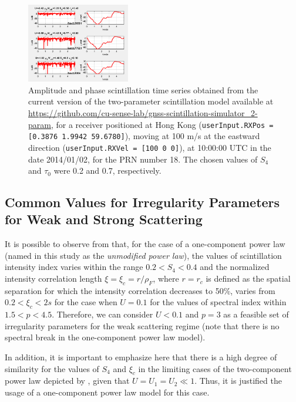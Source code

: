\begin{figure}
    \centering
    \includegraphics[width=0.40\textwidth]{figures/Low_intensity_test.png}
    \caption{Amplitude and phase scintillation time series obtained from the current version of the two-parameter scintillation model available at \url{https://github.com/cu-sense-lab/gnss-scintillation-simulator_2-param}, for a receiver positioned at Hong Kong (\texttt{userInput.RXPos = [0.3876 1.9942 59.6780]}), moving at 100 m/s at the eastward direction (\texttt{userInput.RXVel = [100 0 0]}), at 10:00:00 UTC in the date 2014/01/02, for the PRN number 18. The chosen values of $S_4$ and $\tau_0$ were 0.2 and 0.7, respectively.}
    \label{fig:low_scintillation_test}
\end{figure}

\subsection{Common Values for Irregularity Parameters for Weak and Strong Scattering}
\label{subsec:common_values_irr_param}
It is possible to observe from \cite[Section 4.4, Figures 7a, 7b, 8a, 8b]{Carrano2016OverviewOfTwoComponentPowerLaw} that, for the case of a one-component power law (named in this study as the \textit{unmodified power law}), the values of scintillation intensity index varies within the range $0.2 < S_4 < 0.4$ and the normalized intensity correlation length $\xi = \xi_c = r / \rho_F$, where $r=r_c$ is defined as the spatial separation for which the intensity correlation decreases to 50\%, varies from $0.2 < \xi_c < 2 s$ for the case when $U = 0.1$ for the values of spectral index within $1.5 < p < 4.5$. Therefore, we can consider $U < 0.1$ and $p=3$ as a feasible set of irregularity parameters for the weak scattering regime (note that there is no spectral break in the one-component power law model).

In addition, it is important to emphasize here that there is a high degree of similarity for the values of $S_4$ and $\xi_c$ in the limiting cases of the two-component power law depicted by \cite[Section 4.4, Figures 7c, 7d, 7e, 7f, 8c, 8d, 8e, 8f]{Carrano2016OverviewOfTwoComponentPowerLaw}, given that $U = U_1 = U_2 \ll 1$. Thus, it is justified the usage of a one-component power law model for this case.

